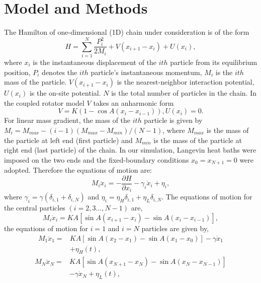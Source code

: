 \documentclass[pra,preprint,superscriptaddress,showkeys,showpacs]{revtex4}
\begin{document}
\section{Model and Methods}
\indent  The Hamilton of one-dimensional (1D) chain under
consideration is of the form \cite{a1,a2}
\begin{equation}\label{}
    H=\sum^{N}_{i=1}\frac{P^{2}_{i}}{2M_{i}}+V(x_{i+1}-x_{i})+U(x_{i}),
\end{equation}
where $x_{i}$ is the instantaneous displacement of the $ith$
particle from its equilibrium position, $P_{i}$ denotes the $ith$
particle's instantaneous momentum, $M_{i}$ is the $ith$ mass of the
particle. $V(x_{i+1}-x_{i})$ is the nearest-neighbor interaction
potential, $U(x_{i})$ is the on-site potential. $N$ is the total
number of particles in the chain. In the coupled rotator model $V$
takes an anharmonic form \cite{a1,a2}
\begin{equation}\label{}
V=K(1-\cos A(x_{i}-x_{i-1})), U(x_{i})=0.
\end{equation}
For linear mass gradient, the mass of the $ith$ particle is given by
 $M_{i}=M_{max}-(i-1)(M_{max}-M_{min})/(N-1)$, where $M_{max}$ is the  mass of
 the particle at left end (first particle) and $M_{min}$ is the mass of the particle
 at right end (last particle) of the chain. In our simulation, Langevin heat baths\cite{a1} were imposed on the two ends
 and the fixed-boundary conditions $x_{0}=x_{N+1}=0$ were adopted.
Therefore the equations of motion are:
\begin{equation}\label{}
M_{i}\ddot{x}_{i}=-\frac{\partial{H}}{\partial{x_{i}}}-\gamma_{i}\dot{x}_{i}+\eta_{i},
\end{equation}
where $\gamma_{i}=\gamma(\delta_{i,1}+\delta_{i,N})$ and
$\eta_{i}=\eta_{H}\delta_{i,1}+\eta_{L}\delta_{i,N}$. The equations
of motion for the central particles $(i=2,3...,N-1)$ are,
\begin{equation}\label{}
M_{i}\ddot{x}_{i}=KA[\sin{A(x_{i+1}-x_{i})}-\sin{A(x_{i}-x_{i-1})}],
\end{equation}
the equations of motion for $i=1$ and $i=N$ particles are given by,
\begin{equation}\label{}
\begin{aligned}
M_{1}\ddot{x}_{1}=&KA[\sin{A(x_{2}-x_{1})}-\sin{A(x_{1}-x_{0})}]-\gamma{\dot{x}_{1}}\\
&+\eta_{H}(t),
\end{aligned}
\end{equation}
\begin{equation}
\begin{aligned}\label{}
M_{N}\ddot{x}_{N}=&KA[\sin{A(x_{N+1}-x_{N})}-\sin{A(x_{N}-x_{N-1})}]\\
&-\gamma{\dot{x}_{N}}+\eta_{L}(t),
\end{aligned}
\end{equation}
\end{document}
